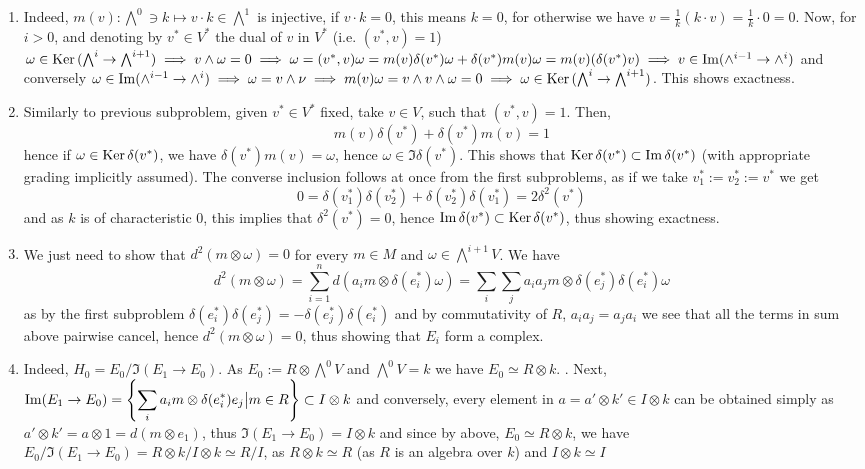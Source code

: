 \documentclass[8pt,fleqn]{article} %
\newcommand{\Ker}{\mbox{\normalfont Ker\,}}
\begin{document}
\begin{enumerate}[label=\bfseries Problem \arabic*.]
\begin{enumerate}[label=(\arabic*).]
\item Indeed, $m(v):\bigwedge^0\ni k\mapsto v\cdot k\in\bigwedge^1$ is injective, if $v\cdot k=0$, this means $k=0$, for otherwise we have
$v=\frac{1}{k}(k\cdot v)=\frac{1}{k}\cdot 0=0$. Now, for $i>0$, and denoting by $v^*\in V^*$ the dual of $v$ in $V^*$ (i.e. $(v^*,v)=1$)
$\omega\in\Ker(\bigwedge^i\to\bigwedge^{i+1})\implies v\wedge\omega=0\implies \omega=(v^*,v)\omega=m(v)\delta(v^*)\omega+\delta(v^*)m(v)\omega=
m(v)(\delta(v^*)v)\implies v\in\Im(\wedge^{i-1}\to\wedge^i)$ and conversely $\omega\in\Im(\wedge^{i-1}\to\wedge^i)\implies\omega=v\wedge\nu\implies
m(v)\omega=v\wedge v\wedge\omega=0\implies\omega\in\Ker(\bigwedge^i\to\bigwedge^{i+1})$. This shows exactness.
\item Similarly to previous subproblem, given $v^*\in V^*$ fixed, take $v\in V$, such that $(v^*,v)=1$. Then,
	\[m(v)\delta(v^*)+\delta(v^*)m(v)=1\]
	hence if $\omega\in\Ker\delta(v^*)$, we have $\delta(v^*)m(v)=\omega$, hence $\omega\in\Im\delta(v^*)$. This shows that $\Ker\delta(v^*)
	\subset\Im\delta(v^*)$ (with appropriate grading implicitly assumed). The converse inclusion follows at once from the first subproblems,
	as if we take $v_1^*:=v_2^*:=v^*$ we get
	\[0=\delta(v_1^*)\delta(v_2^*)+\delta(v_2^*)\delta(v_1^*)=2\delta^2(v^*)\]
	and as $k$ is of characteristic $0$, this implies that $\delta^2(v^*)=0$, hence $\Im\delta(v^*)\subset\Ker\delta(v^*)$, thus
	showing exactness.
\item We just need to show that $d^2(m\otimes\omega)=0$ for every $m\in M$ and $\omega\in\bigwedge^{i+1}V$. We have
	\[d^2(m\otimes\omega)=\sum_{i=1}^nd(a_im\otimes\delta(e_i^*)\omega)=\sum_{i}\sum_ja_ia_jm\otimes\delta(e_j^*)\delta(e_i^*)\omega\]
	as by the first subproblem $\delta(e_i^*)\delta(e_j^*)=-\delta(e_j^*)\delta(e_i^*)$ and by commutativity of $R$, $a_ia_j=a_ja_i$ we see
	that all the terms in sum above pairwise cancel, hence $d^2(m\otimes\omega)=0$, thus showing that $E_i$ form a complex.
\item Indeed, $H_0=E_0/\Im(E_1\to E_0)$. As $E_0:=R\otimes\bigwedge^0V$ and $\bigwedge^0V=k$ we have $E_0\simeq R\otimes k$.
	. Next, $\Im(E_1\to E_0)=\mysetn{\sum_i a_im\otimes\delta(e_i^*)e_j}{m\in R}\subset I\otimes k$ and conversely, every element in $a=a'\otimes
	k'\in I\otimes k$ can be obtained simply as $a'\otimes k'=
	a\otimes1=d(m\otimes e_1)$, thus $\Im(E_1\to E_0)=I\otimes k$ and since by above, $E_0\simeq R\otimes k$, we have
	$E_0/\Im(E_1\to E_0)=R\otimes k/I\otimes k\simeq R/I$, as $R\otimes k\simeq R$ (as $R$ is an algebra over $k$) and $I\otimes k\simeq I$

\end{enumerate}
\end{enumerate}
\end{document}
